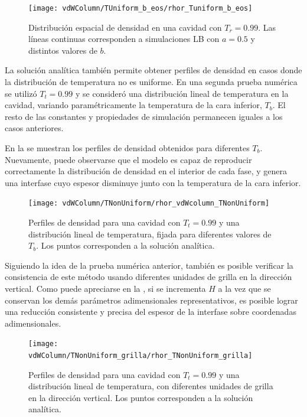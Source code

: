 \begin{figure}[ht]
	\centering
	\texttt{[image: vdWColumn/TUniform\_b\_eos/rhor\_Tuniform\_b\_eos]}
	\caption{Distribuci\'on espacial de densidad en una cavidad con $T_r = 0.99$. Las l\'ineas continuas corresponden a simulaciones LB con $a=0.5$ y distintos valores de $b$.}
	\label{fig:vdWColumn_b_eos}
\end{figure}
\FloatBarrier

La soluci\'on anal\'itica tambi\'en permite obtener perfiles de densidad en casos donde la distribuci\'on de temperatura no es uniforme. En una segunda prueba num\'erica se utiliz\'o $T_t=0.99$ y se consider\'o una distribuci\'on lineal de temperatura en la cavidad, variando param\'etricamente la temperatura de la cara inferior, $T_b$. El resto de las constantes y propiedades de simulaci\'on permanecen iguales a los casos anteriores.

En la  se muestran los perfiles de densidad obtenidos para diferentes $T_b$. Nuevamente, puede observarse que el modelo \pp{} es capaz de reproducir correctamente la distribuci\'on de densidad en el interior de cada fase, y genera una interfase cuyo espesor disminuye junto con la temperatura de la cara inferior.

\begin{figure}[ht]
	\centering
	\texttt{[image: vdWColumn/TNonUniform/rhor\_vdWcolumn\_TNonUniform]}
	\caption{Perfiles de densidad para una cavidad con $T_t = 0.99$ y una distribuci\'on lineal de temperatura, fijada para diferentes valores de $T_b$. Los puntos corresponden a la soluci\'on anal\'itica.}
	\label{fig:vdWColumn_rhor_TNonUniform}
\end{figure}

Siguiendo la idea de la prueba num\'erica anterior, tambi\'en es posible verificar la consistencia de este m\'etodo \pp{} usando diferentes unidades de grilla en la direcci\'on vertical. Como puede apreciarse en la , si se incrementa $H$ a la vez que se conservan los dem\'as par\'ametros adimensionales representativos, es posible lograr una reducci\'on consistente y precisa del espesor de la interfase sobre coordenadas adimensionales.

\begin{figure}[ht]
	\centering
	\texttt{[image: vdWColumn/TNonUniform\_grilla/rhor\_TNonUniform\_grilla]}
	\caption{Perfiles de densidad para una cavidad con $T_t = 0.99$ y una distribuci\'on lineal de temperatura, con diferentes unidades de grilla en la direcci\'on vertical. Los puntos corresponden a la soluci\'on anal\'itica.}
	\label{fig:vdWColumn_TNonUniform_grilla}
\end{figure}
\FloatBarrier


